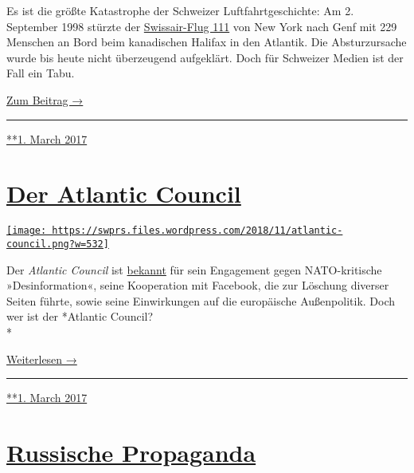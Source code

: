 Es ist die größte Katastrophe der Schweizer Luft­fahrt­geschichte: Am 2.
September 1998 stürzte der
\href{https://en.wikipedia.org/wiki/Swissair_Flight_111}{Swissair-Flug
111} von New York nach Genf mit 229 Menschen an Bord beim kanadischen
Halifax in den Atlantik. Die Ab­sturz­ursache wur­de bis heute nicht
überzeugend aufgeklärt. Doch für Schweizer Medien ist der Fall ein Tabu.

\href{https://swprs.org/der-absturz-swissair-111/}{Zum Beitrag →}

\begin{center}\rule{0.5\linewidth}{\linethickness}\end{center}

\href{https://swprs.org/2017/03/01/der-absturz-swissair-111/}{**1. March
2017}

\hypertarget{der-atlantic-council}{%
\section{\texorpdfstring{\href{https://swprs.org/2017/03/01/der-atlantic-council/}{Der
Atlantic Council}}{Der Atlantic Council}}\label{der-atlantic-council}}

\href{https://swprs.org/2017/03/01/der-atlantic-council/}{\texttt{[image: https://swprs.files.wordpress.com/2018/11/atlantic-council.png?w=532]}}

Der \emph{Atlantic Council} ist
\href{https://www.rubikon.news/artikel/facebook-als-waffe}{bekannt} für
sein En­ga­ge­ment gegen NATO-kritische »Des­in­for­ma­tion«, seine
Kooperation mit Facebook, die zur Lö­schung diverser Seiten führte,
sowie seine Ein­wir­kungen auf die eu­ro­pä­ische Außen­politik. Doch
wer ist der *Atlantic Council?\\
*

\href{https://swprs.org/atlantic-council/}{Weiterlesen →}

\begin{center}\rule{0.5\linewidth}{\linethickness}\end{center}

\href{https://swprs.org/2017/03/01/der-atlantic-council/}{**1. March
2017}

\hypertarget{russische-propaganda}{%
\section{\texorpdfstring{\href{https://swprs.org/2017/03/01/russische-propaganda/}{Russische
Propaganda}}{Russische Propaganda}}\label{russische-propaganda}}

